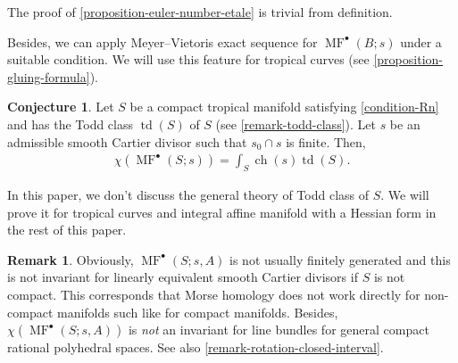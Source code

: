 \documentclass[a4paper,dvipdfmx,reqno,12pt]{amsart}
\theoremstyle{definition}
\newtheorem{conjecture}[theorem]{Conjecture}
\newtheorem{remark}[theorem]{Remark}
\newcommand{\opn}[1]{\operatorname{#1}}
\numberwithin{equation}{section}
\begin{document}
The proof of \cref{proposition-euler-number-etale} is trivial from definition.

Besides, we can apply Meyer--Vietoris exact sequence 
for $\opn{MF}^{\bullet}(B;s)$ under a suitable condition.
We will use this feature for tropical curves (see
\cref{proposition-gluing-formula}). 
\begin{conjecture} 
\label{conjecture-tropical-MRR}
Let $S$ be a compact tropical manifold satisfying 
\cref{condition-Rn} and has the Todd class $\opn{td}(S)$ 
of $S$ (see \cref{remark-todd-class}).
Let $s$ be an admissible smooth Cartier divisor such that
$s_0\cap s$ is finite. Then, 
\begin{align}
\chi(\opn{MF}^{\bullet}(S;s))=\int_{S}\opn{ch}(s)\opn{td}(S).
\end{align}
\end{conjecture}
In this paper, we don't discuss the general theory of 
Todd class of $S$.
We will prove it for tropical curves and integral 
affine manifold with a Hessian form in the 
rest of this paper.

\begin{remark}
Obviously, $\opn{MF}^{\bullet}(S;s,A)$ is not usually 
finitely generated and this is not invariant 
for linearly equivalent smooth Cartier divisors
if $S$ is not compact.
This corresponds that Morse homology does not work directly
for non-compact manifolds such 
like for compact manifolds.
Besides, $\chi(\opn{MF}^{\bullet}(S;s,A))$ is \emph{not}
an invariant for line bundles for general compact rational 
polyhedral spaces. See also 
\cref{remark-rotation-closed-interval}.  
\end{remark}
\end{document}
